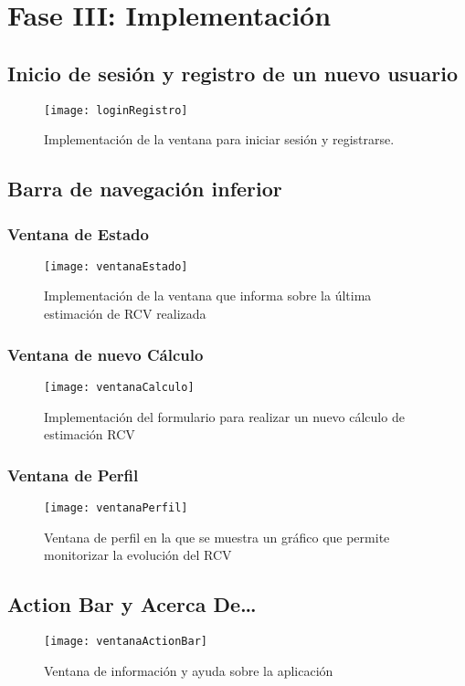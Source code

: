 \chapter{Fase III: Implementación}
\label{cap:Implementacion}

\section{Inicio de sesión y registro de un nuevo usuario}

\begin{figure}[H]
	\centering
	\texttt{[image: loginRegistro]} 
	\caption[loginRegistro]{Implementación de la ventana para iniciar sesión y registrarse.}
	
	\label{fig:loginRegistro}
\end{figure}



\section{Barra de navegación inferior}

\subsection{Ventana de Estado}
\begin{figure}[H]
	\centering
	\texttt{[image: ventanaEstado]} 
	\caption[Implementación Estado]{Implementación de la ventana que informa sobre la última estimación de RCV realizada}
	
	\label{fig:ventanaEstado}
\end{figure}
\subsection{Ventana de nuevo Cálculo}
\begin{figure}[H]
	\centering
	\texttt{[image: ventanaCalculo]} 
	\caption[Implementación Calculo]{Implementación del formulario para realizar un nuevo cálculo de estimación RCV}

	\label{fig:ventanaCalculo}
\end{figure}
\subsection{Ventana de Perfil}
\begin{figure}[H]
	\centering
	\texttt{[image: ventanaPerfil]} 
	\caption[Implementación Perfil]{Ventana de perfil en la que se muestra un gráfico que permite monitorizar la evolución del RCV}
	
	\label{fig:ventanaPerfil}
\end{figure}

\section{Action Bar y Acerca De…}
\begin{figure}[H]
	\centering
	\texttt{[image: ventanaActionBar]} 
	\caption[Implementación Estado]{Ventana de información y ayuda sobre la aplicación}
	
	\label{fig:ventanaBar}
\end{figure}